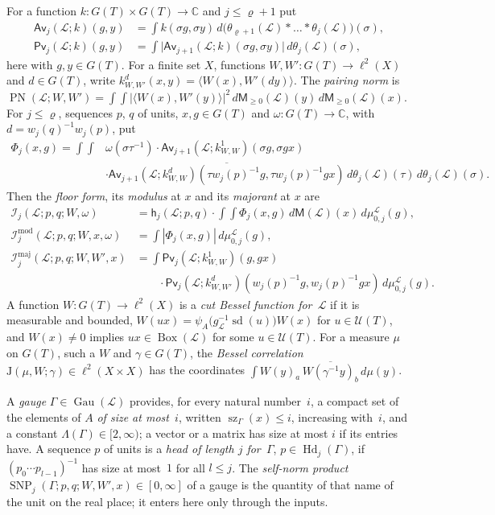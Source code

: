 \documentclass[11pt,a4paper]{article}
\newcommand{\m}[1]{\mbox{$#1$}}        %
\theoremstyle{plainx}
\theoremstyle{uprightx}
\newcommand{\cL}{\mathcal{L}}                       %
\newcommand{\GT}[1]{G(#1)}                          %
\newcommand{\UT}[1]{\mathcal{U}(#1)}                %
\newcommand{\sd}[1]{\operatorname{sd}(#1)}          %
\newcommand{\weyl}[2]{w_{#1}(#2)}                   %
\newcommand{\gL}[1]{g_{#1}}                         %
\newcommand{\BoxL}[1]{\operatorname{Box}(#1)}       %
\newcommand{\Gauges}[1]{\operatorname{Gau}(#1)}     %
\newcommand{\Lam}[1]{\Lambda(#1)}                   %
\newcommand{\szl}[3]{\operatorname{sz}_{#1}(#2)\le #3} %
\newcommand{\Hd}[3]{#3\in\operatorname{Hd}_{#2}(#1)} %
\newcommand{\gM}[1]{\mathsf{M}(#1)}                 %
\newcommand{\gMu}[1]{\mathsf{M}_{\ge0}(#1)}         %
\newcommand{\flm}[2]{\theta_{#2}(#1)}               %
\newcommand{\stk}[3]{\mu^{#1}_{#2,#3}}              %
\newcommand{\Av}[5]{\mathsf{Av}_{#2}(#1;#3)(#4,#5)} %
\newcommand{\Pv}[5]{\mathsf{Pv}_{#2}(#1;#3)(#4,#5)} %
\newcommand{\PN}[3]{\operatorname{PN}(#1;#2,#3)}    %
\newcommand{\hdens}[4]{\mathsf{h}_{#2}(#1;#3,#4)}   %
\newcommand{\fform}[6]{\mathcal{I}_{#2}(#1;#3,#4;#5,#6)} %
\newcommand{\fmodu}[7]{\mathcal{I}^{\mathrm{mod}}_{#2}(#1;#3,#4;#5,#6,#7)} %
\newcommand{\fmaj}[7]{\mathcal{I}^{\mathrm{maj}}_{#2}(#1;#3,#4;#5,#6,#7)} %
\newcommand{\snp}[7]{\operatorname{SNP}_{#2}(#1;#3,#4;#5,#6,#7)} %
\newcommand{\bcorr}[3]{\mathrm{J}(#1,#2;#3)}        %
\newcommand{\CC}{\mathbb{C}}
\begin{document}
For a function \m{k\colon\GT{T}\times\GT{T}\to\CC} and \m{j\le\varrho+1} put
\begin{align*}
\Av{\cL}{j}{k}{g}{y}&=\int k(\sigma g,\sigma y)\,d\bigl(\flm{\cL}{\varrho+1}*\dots*\flm{\cL}{j}\bigr)(\sigma),\\
\Pv{\cL}{j}{k}{g}{y}&=\int\bigl|\Av{\cL}{j+1}{k}{\sigma g}{\sigma y}\bigr|\,d\flm{\cL}{j}(\sigma),
\end{align*}
here with \m{g,y\in\GT{T}}. For a finite set $X$, functions \m{W,W'\colon\GT{T}\to\ell^2(X)} and \m{d\in\GT{T}}, write
$k_{W,W'}^{d}(x,y)=\langle W(x),W'(dy)\rangle$. The \emph{pairing norm} is
$\PN{\cL}{W}{W'}=\int\!\!\int|\langle W(x),W'(y)\rangle|^2\,d\gMu{\cL}(y)\,d\gMu{\cL}(x)$. For \m{j\le\varrho},
sequences $p$, $q$ of units, \m{x,g\in\GT{T}} and \m{\omega\colon\GT{T}\to\CC}, with \m{d=\weyl{j}{q}^{-1}\weyl{j}{p}}, put
\begin{align*}
\Phi_j(x,g)=\int\!\!\int&\omega(\sigma\tau^{-1})\cdot\Av{\cL}{j+1}{k^{1}_{W,W}}{\sigma g}{\sigma gx}\\
&\cdot\overline{\Av{\cL}{j+1}{k^{d}_{W,W}}{\tau\weyl{j}{p}^{-1}g}{\tau\weyl{j}{p}^{-1}gx}}\,d\flm{\cL}{j}(\tau)\,d\flm{\cL}{j}(\sigma).
\end{align*}
Then the \emph{floor form}, its \emph{modulus} at $x$ and its \emph{majorant} at $x$ are
\begin{align*}
\fform{\cL}{j}{p}{q}{W}{\omega}&=\hdens{\cL}{j}{p}{q}\cdot\int\!\!\int\Phi_j(x,g)\,d\gM{\cL}(x)\,d\stk{\cL}{0}{j}(g),\\
\fmodu{\cL}{j}{p}{q}{W}{x}{\omega}&=\int|\Phi_j(x,g)|\,d\stk{\cL}{0}{j}(g),\\
\fmaj{\cL}{j}{p}{q}{W}{W'}{x}&=\int\Pv{\cL}{j}{k^{1}_{W,W}}{g}{gx}\\
&\qquad\cdot\Pv{\cL}{j}{k^{d}_{W,W'}}{\weyl{j}{p}^{-1}g}{\weyl{j}{p}^{-1}gx}\,d\stk{\cL}{0}{j}(g).
\end{align*}
A function \m{W\colon\GT{T}\to\ell^2(X)} is a \emph{cut Bessel function for~$\cL$} if it is measurable and bounded,
\m{W(ux)=\psi_A\bigl(\gL{\cL}^{-1}\sd{u}\bigr)W(x)} for \m{u\in\UT{T}}, and \m{W(x)\ne0} implies \m{ux\in\BoxL{\cL}}
for some \m{u\in\UT{T}}. For a measure $\mu$ on \m{\GT{T}}, such a $W$ and \m{\gamma\in\GT{T}}, the \emph{Bessel
correlation} \m{\bcorr{\mu}{W}{\gamma}\in\ell^2(X\times X)} has the coordinates
\m{\int W(y)_a\,\overline{W(\gamma^{-1}y)_b}\,d\mu(y)}.

A \emph{gauge} \m{\Gamma\in\Gauges{\cL}} provides, for every natural number~$i$, a compact set of the elements
of $A$ \emph{of size at most~$i$}, written \m{\szl{\Gamma}{x}{i}}, increasing with~$i$, and a constant
\m{\Lam{\Gamma}\in[2,\infty)}; a vector or a matrix has size at most $i$ if its entries have. A sequence $p$ of
units is a \emph{head of length $j$ for~$\Gamma$}, \m{\Hd{\Gamma}{j}{p}}, if \m{(p_0\cdots p_{l-1})^{-1}} has size at
most~$1$ for all \m{l\le j}. The \emph{self-norm product}
\m{\snp{\Gamma}{j}{p}{q}{W}{W'}{x}\in[0,\infty]} of a gauge is the quantity of that name of the unit on the real
place; it enters here only through the inputs.
\end{document}
